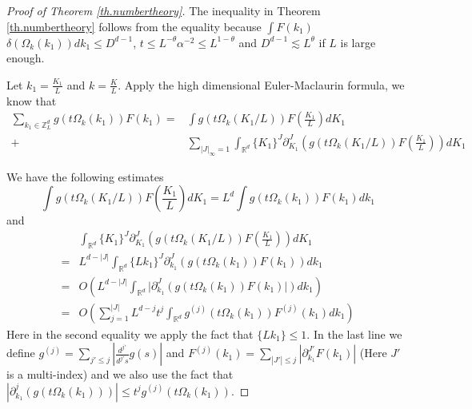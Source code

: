 \begin{proof}[Proof of Theorem \ref{th.numbertheory}] The inequality in Theorem \ref{th.numbertheory} follows from the equality because $\int F(k_1)$ $ \delta(\Omega_k(k_1)) dk_1\le D^{d-1}$, $t\le L^{-\theta}\alpha^{-2}\le L^{1-\theta}$ and $D^{d-1}\lesssim L^{\theta}$ if $L$ is large enough.

Let $k_{1}=\frac{K_1}{L}$ and $k=\frac{K}{L}$. Apply the high dimensional Euler-Maclaurin formula, we know that
\begin{equation}
\begin{split}
    \sum_{k_1\in \mathbb{Z}_L^d} g(t\Omega_k(k_1)) F(k_1)=&\int g(t\Omega_k(K_1/L)) F\left(\frac{K_1}{L}\right) dK_1 
    \\
    +& \sum_{ |J|_{\infty} = 1}\int_{\mathbb{R}^d} \{K_1\}^{J} \partial_{K_1}^{J}\left(g(t\Omega_k(K_1/L)) F\left(\frac{K_1}{L}\right)\right) dK_1
\end{split}
\end{equation}

We have the following estimates
\begin{equation}\label{eq.asymptoticlemmaeq1.threewave}
    \int g(t\Omega_k(K_1/L)) F\left(\frac{K_1}{L}\right) dK_1 =L^d\int g(t\Omega_k(k_1)) F(k_1) dk_1 
\end{equation}
and
\begin{equation}\label{eq.asymptoticlemmaeq2.threewave}
\begin{split}
    &\int_{\mathbb{R}^d} \{K_1\}^{J} \partial_{K_1}^{J}\left(g(t\Omega_k(K_1/L)) F\left(\frac{K_1}{L}\right)\right) dK_1
    \\
    = &L^{d-|J|}\int_{\mathbb{R}^d} \{Lk_1\}^{J} \partial_{k_1}^{J}\left(g(t\Omega_k(k_1)) F(k_1)\right) dk_1
    \\
    = &O\left(L^{d-|J|}\int_{\mathbb{R}^d}  |\partial_{k_1}^{J}\left(g(t\Omega_k(k_1))F(k_1)|\right) dk_1\right)
    \\
    = &O\left(\sum^{|J|}_{j=1}L^{d-j}t^{j}\int_{\mathbb{R}^d}  g^{(j)}(t\Omega_k(k_1))F^{(j)}(k_1) dk_1 \right)
\end{split}
\end{equation}
Here in the second equality we apply the fact that $\{Lk_1\}\le 1$. In the last line we define $g^{(j)}=\sum_{j'\le j} \left|\frac{d^{j'}}{d^{j'}s}g(s)\right|$ and $F^{(j)}(k_1)=\sum_{|J'|\le j}|\partial^{J'}_{k_1}F(k_1)|$ (Here $J'$ is a multi-index) and we also use the fact that $|\partial_{k_1}^{j}(g(t\Omega_k(k_1)))|\le t^{j} g^{(j)}(t\Omega_k(k_1))$. 


\end{proof}
